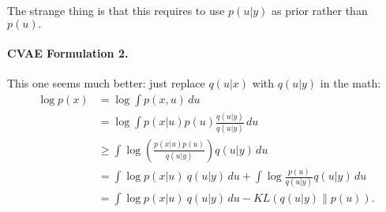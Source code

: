 The strange thing is that this requires to use $p(u|y)$ as prior rather than $p(u).$

\paragraph{CVAE Formulation 2.} This one seems much better: just replace $q(u|x)$ with $q(u|y)$ in the math:
$$
\begin{aligned}
\log p(x)
&= \log \int p(x,u) \,du \\
&= \log \int p(x|u) p(u) \frac{q(u|y)}{q(u|y)}  \,du \\
&\geq \int \log \left(\frac{p(x|u) p(u)}{q(u|y)}\right) q(u|y) \,du \\
&=
\int \log p(x|u)~ q(u|y) \,du +
\int \log \frac{p(u)}{q(u|y)} q(u|y) \,du\\
&=
\int \log p(x|u)~ q(u|y) \,du
-
KL(q(u|y) \| p(u)).
\end{aligned}
$$

